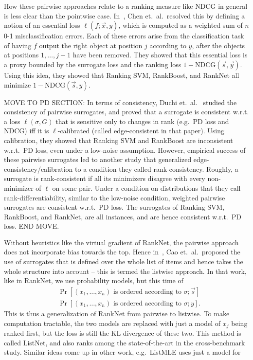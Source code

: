 How these pairwise approaches relate to a ranking measure like NDCG in general
is less clear than the pointwise case.
In~\cite{chen2009rankingmeasures}, Chen et.\ al.\ resolved this by defining
a notion of an essential loss $\ell(f; \vec{x}, y)$, which is computed as a
weighted sum of $n$ 0-1 misclassification errors. Each of these errors arise
from the classification task of having $f$ output the right object at position
$j$ according to $y$, after the objects at positions $1, \ldots, j-1$ have been
removed. They showed that this essential loss is a proxy bounded by
the surrogate loss and the ranking loss $1 - \text{NDCG}(\vec{s}, \vec{y})$.
Using this idea, they showed that Ranking SVM, RankBoost, and RankNet all
minimize $1 - \text{NDCG}(\vec{s}, y)$.

MOVE TO PD SECTION:
In terms of consistency, Duchi et.\ al.~\cite{duchi2010ranking}
studied the consistency of pairwise
surrogates, and proved that a surrogate is consistent w.r.t. a
loss $\ell(\sigma, G)$ that is sensitive only to changes in rank
(e.g.\ PD loss and NDCG) iff it is $\ell$-calibrated (called edge-consistent
in that paper). Using calibration, they showed that Ranking SVM and RankBoost
are inconsistent w.r.t.\ PD loss, even under a low-noise assumption.
However, empirical success of these pairwise surrogates led to another study
that generalized edge-consistency/calibration to a condition they called
rank-consistency.
Roughly, a surrogate is rank-consistent if all its minimizers
disagree with every non-minimizer of $\ell$ on some pair. Under a condition
on distributions that they call rank-differentiability,
similar to the low-noise condition, weighted pairwise surrogates are consistent
w.r.t.\ PD loss. The surrogates of Ranking SVM, RankBoost, and RankNet, are
all instances, and are hence consistent w.r.t.\ PD loss.
END MOVE.

Without heuristics like the virtual gradient of RankNet, the pairwise approach
does not incorporate bias towards the top. Hence
in~\cite{from-pairwise-to-listwise}, Cao et.\ al.\ proposed the use of 
surrogates that is defined over the whole list of items and hence takes the
whole structure into account -- this is termed the listwise approach.
In that work, like in RankNet, we use probability models, but this time of
\begin{align*}
  &\Pr[\text{$(x_1, \ldots, x_n)$ is ordered according to $\sigma$} ; \vec{s}] \\
  &\Pr[\text{$(x_1, \ldots, x_n)$ is ordered according to $\sigma$} ; y].
\end{align*}
This is thus a generalization of RankNet from pairwise to listwise. To make
computation tractable, the two models are replaced with just a model of
$x_j$ being ranked first, but the loss is still the KL divergence of these two.
This method is called ListNet, and also ranks among the state-of-the-art in the
cross-benchmark study. Similar ideas come up in other work, e.g.\ ListMLE
uses just a model for 

